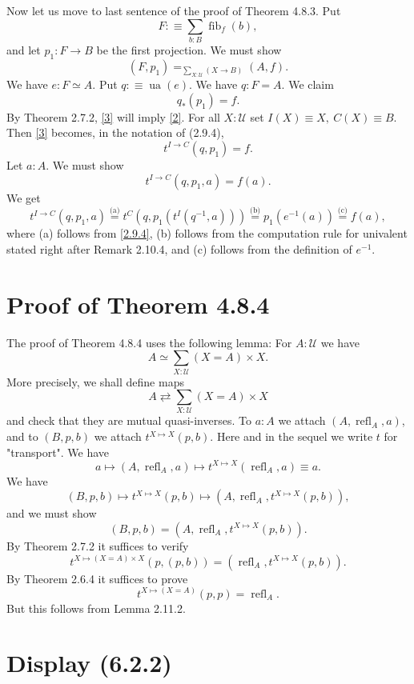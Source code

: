 \documentclass[12pt]{article}
\newcommand{\oo}{\operatorname}
\newcommand{\U}{\mathcal U}
\begin{document}
Now let us move to last sentence of the proof of Theorem 4.8.3. Put
$$
F:\equiv\sum_{b:B}\oo{fib}_f(b),
$$ 
and let $p_1:F\to B$ be the first projection. We must show 
\begin{equation}\label{2}
(F,p_1)=_{\sum_{X:\U}(X\to B)}(A,f).
\end{equation} 
We have $e:F\simeq A$. Put $q:\equiv\oo{ua}(e)$. We have $q:F=A$. We claim 
\begin{equation}\label{3}
q_*(p_1)=f.
\end{equation} 
By Theorem 2.7.2, \eqref{3} will imply \eqref{2}. For all $X:\U$ set $I(X)\equiv X,\ C(X)\equiv B$. Then \eqref{3} becomes, in the notation of (2.9.4), 
$$
t^{I\to C}(q,p_1)=f.
$$ 
Let $a:A$. We must show 
$$
t^{I\to C}(q,p_1,a)=f(a).
$$ 
We get 
$$
t^{I\to C}(q,p_1,a)\overset{\text{(a)}}=t^C(q,p_1(t^I(q^{-1},a)))\overset{\text{(b)}}=p_1(e^{-1}(a))\overset{\text{(c)}}=f(a),
$$ 
where (a) follows from \eqref{2.9.4}, (b) follows from the computation rule for univalent stated right after Remark 2.10.4, and (c) follows from the definition of $e^{-1}$.


\section{Proof of Theorem 4.8.4}

The proof of Theorem 4.8.4 uses the following lemma: For $A:\U$ we have 
$$
A\simeq\sum_{X:\U}(X=A)\times X.
$$
More precisely, we shall define maps 
$$
A\rightleftarrows\sum_{X:\U}(X=A)\times X
$$ 
and check that they are mutual quasi-inverses. To $a:A$ we attach $(A,\oo{refl}_A,a)$, and to $(B,p,b)$ we attach $t^{X\mapsto X}(p,b)$. Here and in the sequel we write $t$ for "transport". We have 
$$
a\mapsto(A,\oo{refl}_A,a)\mapsto t^{X\mapsto X}(\oo{refl}_A,a)\equiv a.
$$ 
We have 
$$
(B,p,b)\mapsto t^{X\mapsto X}(p,b)\mapsto(A,\oo{refl}_A,t^{X\mapsto X}(p,b)),
$$ 
and we must show 
$$
(B,p,b)=(A,\oo{refl}_A,t^{X\mapsto X}(p,b)).
$$ 
By Theorem 2.7.2 it suffices to verify 
$$
t^{X\mapsto (X=A)\times X}(p,(p,b))=(\oo{refl}_A,t^{X\mapsto X}(p,b)).
$$ 
By Theorem 2.6.4 it suffices to prove 
$$
t^{X\mapsto (X=A)}(p,p)=\oo{refl}_A.
$$ 
But this follows from Lemma 2.11.2.


\section{Display (6.2.2)}
\end{document}
